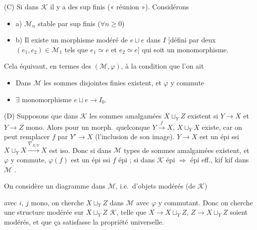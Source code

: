 \documentclass[11pt,a4paper]{article}
\begin{document}
(C) Si dans $\mathcal{K}$ 
il y a des sup finis (« réunion »). Considérons
\begin{itemize}
  \item[4°)] a) $\mathcal{M}_n$ stable par sup finis ($\forall n
  \geqslant 0$)
  \item[] b) Il existe un morphisme modéré de $e \sqcup e$ dans $I$
  [défini par deux $(e_1, e_2) \in \mathcal{M}_1$ tels que $e_1 \simeq e$
  et $e_2 \simeq e$] qui soit un monomorphisme.
\end{itemize}


Cela équivaut, en termes des $(\mathcal{M}, \varphi)$, à la condition que
l'on ait
\begin{itemize}
  \item[a)] Dans $\mathcal{M}$ les sommes disjointes finies existent, et
  $\varphi$ y commute
  \item[b)] $\exists$ monomorphisme $e \sqcup e \to I_0$.
\end{itemize}

(D) Supposons que dans $\mathcal{K}$ les sommes amalgamées $X \sqcup_Y Z$
existent si $Y \to X$ et $Y \to Z$ mono. Alors pour un morph.\ quelconque
$Y \xrightarrow{f} X$, $X \sqcup_Y X$ existe, car on peut remplacer $f$ par
$Y' \to X$ (l'inclusion de son image). $Y \to X$ est un épi ssi $X \sqcup_Y
X \xrightarrow{\nabla_{X/Y}} X$ est iso. Donc si dans $\mathcal{M}$
 types de sommes amalgamées existent, et $\varphi$ y
commute,  $\varphi(f)$ est un épi ssi $f$ 
épi ; si dans $\mathcal{K}$ épi $\Rightarrow$ épi eff., kif kif dans
$\mathcal{M}$ \ill{}.

On considère un diagramme dans $\mathcal{M}$, 
i.e.\ d'objets modérés (de $\mathcal{K}$)


avec $i$, $j$ mono, on cherche $X \sqcup_Y Z$ dans $\mathcal{M}$ avec
$\varphi$ y commutant. Donc on cherche une structure modérée sur $X \sqcup_Y
Z$  $\mathcal{K}$,  telle que $X \to X
\sqcup_Y Z$, $Z \to X \sqcup_Y Z$ soient modérés, et que ça satisfasse la
propriété universelle.
\end{document}

